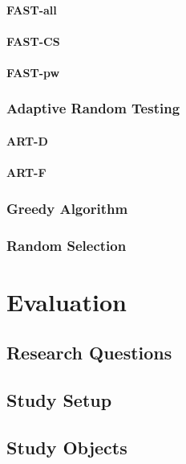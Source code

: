 \documentclass[a4paper,10pt]{article}
\begin{document}
\paragraph{FAST-all}

\paragraph{FAST-CS}

\paragraph{FAST-pw}

\subsubsection{Adaptive Random Testing}

\paragraph{ART-D}

\paragraph{ART-F}

\subsubsection{Greedy Algorithm}

\subsubsection{Random Selection}

\section{Evaluation}

\subsection{Research Questions}

\subsection{Study Setup}

\subsection{Study Objects}
\end{document}
